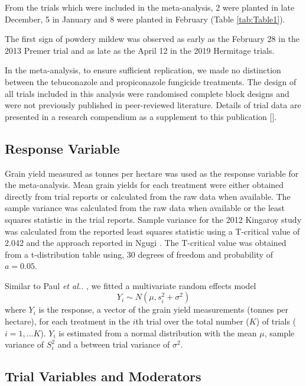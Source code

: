 \documentclass[agronomy,article,submit,moreauthors,pdftex]{mdpi}
\begin{document}
From the trials which were included in the meta-analysis, 2 were planted in late December, 5 in January and 8 were planted in February (Table \ref{tab:Table1}).

The first sign of powdery mildew was observed as early as the February 28 in the 2013 Premer trial and as late as the April 12 in the 2019 Hermitage trials.

In the meta-analysis, to ensure sufficient replication, we made no distinction between the tebuconazole and propiconazole fungicide treatments.
The design of all trials included in this analysis were randomised complete block designs and were not previously published in peer-reviewed literature.
Details of trial data are presented in a research compendium as a supplement to this publication {[}{]}.

\hypertarget{response-variable}{%
\subsection{Response Variable}\label{response-variable}}

Grain yield measured as tonnes per hectare was used as the response variable for the meta-analysis.
Mean grain yields for each treatment were either obtained directly from trial reports or calculated from the raw data when available.
The sample variance was calculated from the raw data when available or the least squares statistic in the trial reports.
Sample variance for the 2012 Kingaroy study was calculated from the reported least squares statistic using a T-critical value of 2.042 and the approach reported in Ngugi \citep{Ngugi2011}.
The T-critical value was obtained from a t-distribution table using, 30 degrees of freedom and probability of \(a = 0.05\).

Similar to Paul \emph{et al..} \citeyearpar{Paul2007}, we fitted a multivariate random effects model
\begin{equation}
Y_i \sim N(\mu,s_i^2 + \sigma^2)
\end{equation}
where \(Y_i\) is the response, a vector of the grain yield measurements (tonnes per hectare), for each treatment in the \(i\)th trial over the total number (\(K\)) of trials (\(i = 1, ...K\)).
\(Y_i\) is estimated from a normal distribution with the mean \(\mu\), sample variance of \(S_i^2\) and a between trial variance of \(\sigma^2\).

\hypertarget{trial-variables-and-moderators}{%
\subsection{Trial Variables and Moderators}\label{trial-variables-and-moderators}}
\end{document}
